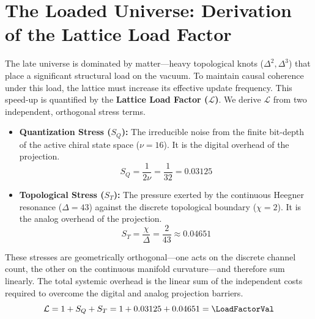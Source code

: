 
\section{The Loaded Universe: Derivation of the Lattice Load Factor}
The late universe is dominated by matter—heavy topological knots ($\Delta^2, \Delta^3$) that place a significant structural load on the vacuum. To maintain causal coherence under this load, the lattice must increase its effective update frequency. This speed-up is quantified by the \textbf{Lattice Load Factor ($\mathcal{L}$)}. We derive $\mathcal{L}$ from two independent, orthogonal stress terms.

\begin{itemize}
    \item \textbf{Quantization Stress ($S_Q$):} The irreducible noise from the finite bit-depth of the active chiral state space ($\nu=16$). It is the digital overhead of the projection.
    \begin{equation}
        S_Q = \frac{1}{2\nu} = \frac{1}{32} = 0.03125
    \end{equation}
    
    \item \textbf{Topological Stress ($S_T$):} The pressure exerted by the continuous Heegner resonance ($\Delta=43$) against the discrete topological boundary ($\chi=2$). It is the analog overhead of the projection.
    \begin{equation}
        S_T = \frac{\chi}{\Delta} = \frac{2}{43} \approx 0.04651
    \end{equation}
\end{itemize}

These stresses are geometrically orthogonal—one acts on the discrete channel count, the other on the continuous manifold curvature—and therefore sum linearly. The total systemic overhead is the linear sum of the independent costs required to overcome the digital and analog projection barriers.
\begin{equation}
\mathcal{L} = 1 + S_Q + S_T = 1 + 0.03125 + 0.04651 = \mathbf{\LoadFactorVal} \\
\end{equation}